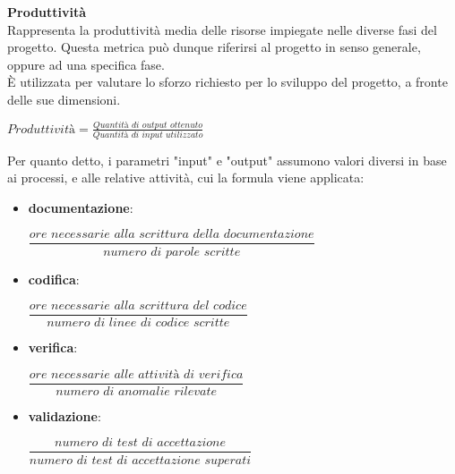 \textbf{Produttività}\\

Rappresenta la produttività media delle risorse impiegate nelle diverse fasi del progetto. Questa metrica può dunque riferirsi al progetto in senso generale, oppure ad una specifica fase.\\ \`E utilizzata per valutare lo sforzo richiesto per lo sviluppo del progetto, a fronte delle sue dimensioni.
\begin{center}
\begin{math}
	\textit{Produttività} = \frac	{\textit{Quantità di output ottenuto}}
									{\textit{Quantità di input utilizzato}}
\end{math}
\end{center}
Per quanto detto, i parametri "input" e "output" assumono valori diversi in base ai processi, e alle relative attività, cui la formula viene applicata:
\begin{itemize}
	\item \textbf{documentazione}:
	\begin{center} 
		\begin{math}
			\dfrac	{\textit{ore necessarie alla scrittura della documentazione}}
					{\textit{numero di parole scritte}}
		\end{math}
	\end{center}	
	\item \textbf{codifica}:
	\begin{center} 
		\begin{math}
			\dfrac	{\textit{ore necessarie alla scrittura del codice}}
					{\textit{numero di linee di codice scritte}}
		\end{math}
	\end{center}	
	\item \textbf{verifica}:
	\begin{center} 
		\begin{math}
			\dfrac	{\textit{ore necessarie alle attivit\`a di verifica}}
					{\textit{numero di anomalie rilevate}}
		\end{math}
	\end{center}		
	\item \textbf{validazione}: 
	\begin{center}
		\begin{math}
			\dfrac	{\textit{numero di test di accettazione}}
					{\textit{numero di test di accettazione superati}}
		\end{math}
	\end{center}		
\end{itemize}

